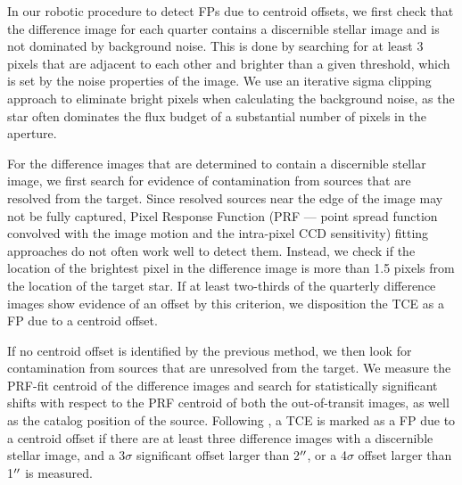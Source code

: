 
In our robotic procedure to detect FPs due to centroid offsets, we first check that the difference image for each quarter contains a discernible stellar image and is not dominated by background noise. This is done by searching for at least 3 pixels that are adjacent to each other and brighter than a given threshold, which is set by the noise properties of the image. We use an iterative sigma clipping approach to eliminate bright pixels when calculating the background noise, as the star often dominates the flux budget of a substantial number of pixels in the aperture.

For the difference images that are determined to contain a discernible stellar image, we first search for evidence of contamination from sources that are resolved from the target. Since resolved sources near the edge of the image may not be fully captured, Pixel Response Function (PRF --- \keplers{} point spread function convolved with the image motion and the intra-pixel CCD sensitivity) fitting approaches do not often work well to detect them. Instead, we check if the location of the brightest pixel in the difference image is more than 1.5 pixels from the location of the target star. If at least two-thirds of the quarterly difference images show evidence of an offset by this criterion, we disposition the TCE as a FP due to a centroid offset. %

If no centroid offset is identified by the previous method, we then look for contamination from sources that are unresolved from the target. We measure the PRF-fit centroid of the difference images and search for statistically significant shifts with respect to the PRF centroid of both the out-of-transit images, as well as the catalog position of the source. Following \citet{Bryson2013}, a TCE is marked as a FP due to a centroid offset if there are at least three difference images with a discernible stellar image, and a 3$\sigma$ significant offset larger than 2$\mbox{$^{\prime\prime}$}$, or a 4$\sigma$ offset larger than 1$\mbox{$^{\prime\prime}$}$ is measured.

